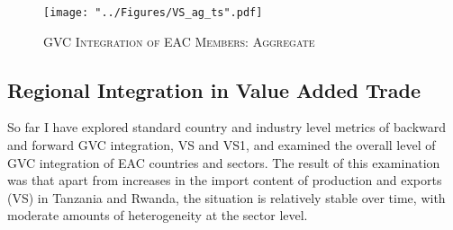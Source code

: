 \documentclass[a4paper]{article}
\begin{document}


\begin{figure}[h!]
\centering
\caption{\label{fig:VSag_ts}\textsc{GVC Integration of EAC Members: Aggregate}}
\texttt{[image: "../Figures/VS\_ag\_ts".pdf]} %
\end{figure}
\FloatBarrier







\subsection{Regional Integration in Value Added Trade}

So far I have explored standard country and industry level metrics of backward and forward GVC integration, VS and VS1, and examined the overall level of GVC integration of EAC countries and sectors. The result of this examination was that apart from increases in the import content of production and exports (VS) in Tanzania and Rwanda, the situation is relatively stable over time, with moderate amounts of heterogeneity at the sector level. \newline
\end{document}
